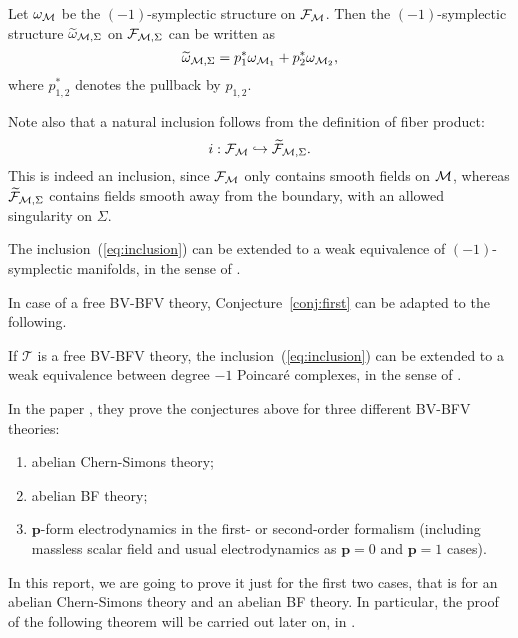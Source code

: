 Let $\omega_{\mathcal{M}}$ be the $(-1)$-symplectic structure on $\mathcal{F}_{\mathcal{M}}$. Then the $(-1)$-symplectic structure $\widetilde{\omega}_{\mathcal{M},\Sigma}$ on $\mathcal{F}_{\mathcal{M},\Sigma}$ can be written as
\begin{equation}
\label{eq:wt_omega}
    \widetilde{\omega}_{\mathcal{M},\Sigma} = 
    p_1^* \omega_{\mathcal{M}_1} + p_2^* \omega_{\mathcal{M}_2} ,
\end{equation}
where $p_{1,2}^*$ denotes the pullback by $p_{1,2}$.

Note also that a natural inclusion follows from the definition of fiber product:
\begin{equation}
\label{eq:inclusion}
    i : \mathcal{F}_{\mathcal{M}} \hookrightarrow \widetilde{\mathcal{F}}_{\mathcal{M},\Sigma} .
\end{equation}
This is indeed an inclusion, since $\mathcal{F}_{\mathcal{M}}$ only contains smooth fields on $\mathcal{M}$, whereas $\widetilde{\mathcal{F}}_{\mathcal{M}, \Sigma}$ contains fields smooth away from the boundary, with an allowed singularity on $\Sigma$.

\begin{conj}
\label{conj:first}
    The inclusion~(\ref{eq:inclusion}) can be extended to a weak equivalence of $(-1)$-symplectic manifolds, in the sense of .
\end{conj}

In case of a free BV-BFV theory, Conjecture~\ref{conj:first} can be adapted to the following.

\begin{conj}
\label{conj:second}
    If $\mathcal{T}$ is a free BV-BFV theory, the inclusion~(\ref{eq:inclusion}) can be extended to a weak equivalence between degree $-1$ Poincaré complexes, in the sense of .
\end{conj}

In the paper \cite{Gluing_BV-BFV}, they prove the conjectures above for three different BV-BFV theories:
\begin{enumerate}[label={\arabic*)}]
    \item abelian Chern-Simons theory;
    \item abelian BF theory;
    \item $\mathbf{p}$-form electrodynamics in the first- or second-order formalism (including massless scalar field and usual electrodynamics as $\mathbf{p} = 0$ and $\mathbf{p} = 1$ cases).
\end{enumerate}

In this report, we are going to prove it just for the first two cases, that is for an abelian Chern-Simons theory and an abelian BF theory.
In particular, the proof of the following theorem will be carried out later on, in .

